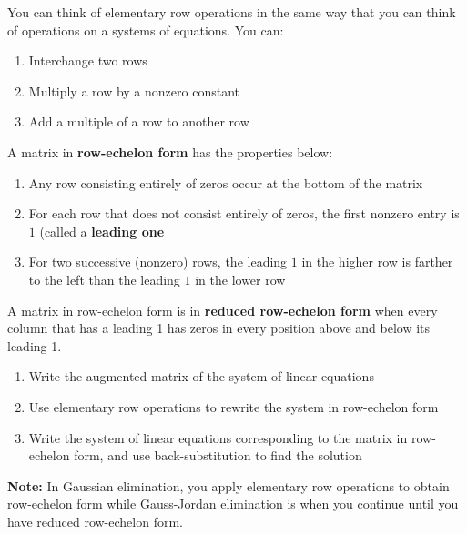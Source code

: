 \documentclass{report}
\begin{document}
\begin{tcolorbox}[title= Elementary Row Operations] 
	You can think of elementary row operations in the same way that you can think of operations on a systems of equations. You can:

\begin{enumerate}
    \item Interchange two rows
    \item Multiply a row by a nonzero constant
    \item Add a multiple of a row to another row
\end{enumerate}

\end{tcolorbox}
\begin{tcolorbox}[title=Row-Echelon Form and Reduced Row-Echelon Form]
	A matrix in \textbf{row-echelon form} has the properties below:

\begin{enumerate}
    \item Any row consisting entirely of zeros occur at the bottom of the matrix
    \item For each row that does not consist entirely of zeros, the first nonzero entry is $1$ (called a \textbf{leading one}
    \item For two successive (nonzero) rows, the leading $1$ in the higher row is farther to the left than the leading $1$ in the lower row
\end{enumerate}

\noindent A matrix in row-echelon form is in \textbf{reduced row-echelon form} when every column that has a leading 1 has zeros in every position above and below its leading 1.

\end{tcolorbox}

\begin{tcolorbox}[title = Gaussian Elimination with Back Substitution]
	
\begin{enumerate}
    \item Write the augmented matrix of the system of linear equations
    \item Use elementary row operations to rewrite the system in row-echelon form
    \item Write the system of linear equations corresponding to the matrix in row-echelon form, and use back-substitution to find the solution
\end{enumerate}

\noindent \textbf{Note:} In Gaussian elimination, you apply elementary row operations to obtain row-echelon form while Gauss-Jordan elimination is when you continue until you have reduced row-echelon form.\\

\end{tcolorbox}
\end{document}
